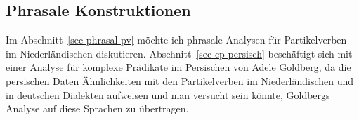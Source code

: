 \begin{comment}
Crysmann verweist darauf, daß bereits Kathol vorgeschlagen hat, 


A further disadvantage of Kathol's proposal is that the fact that the particle
verbs form a predicate complex is not represented in the \synsem part of their lexical entries:
The \vcompv of \emph{aufwachen} in (\ref{le-aufwachen-kathol}) is the empty list.
It is not obvious how the formation of resultative constructions with particle verbs like
in (\ref{ex-muede-herumliest})---repeated here as (\mex{1})---can be blocked.
\ea[\#]{
\gll daß  sich Karl müde  herumliest.\\
     that self Karl tired \partic(around).reads\\
\glt Intended: `that Karl gets tired by reading aimlessly.'
}
\z
In the analysis developed here, the particle is selected via \vcomp and the resultative
construction lexical rules require an input with an empty \vcomp list. Since
the \vcomp list of particle verbs contains the particle, it is correctly
predicted that particle verbs cannot be input to a lexical rule that
licenses resultative constructions. See page~\pageref{bsp-anloslacht2}.

Ein weiterer Nachteil von Kathols und Crysmanns Ansatz ist, daß die Tatsache,
daß Partikel und Verb einen Komplex bilden nicht in dem \type{synsem}"=Objekt
des Verbs repräsentiert ist. Im hier vorgestellten Ansatz ist die Partikel
als selegiertes Element in der \subcatl des Verbs enthalten, in Kathols Ansatz
entspricht das \type{synsem}"=Objekt einem Simplexverb, und es ist deshalb nicht
klar wie man die Beschränkung erfassen will, daß bei der Partikelverbbildung

\end{comment}


%

\subsection{Phrasale Konstruktionen}

Im Abschnitt~\ref{sec-phrasal-pv} möchte ich phrasale Analysen für Partikelverben
im Niederländischen diskutieren. Abschnitt~\ref{sec-cp-persisch} beschäftigt sich mit 
einer Analyse für komplexe Prädikate im Persischen
von Adele Goldberg, da die persischen Daten Ähnlichkeiten mit den
Partikelverben im Niederländischen und in deutschen Dialekten aufweisen und
man versucht sein könnte, Goldbergs Analyse auf diese Sprachen zu übertragen.

